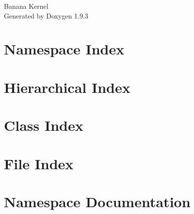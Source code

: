 \documentclass[twoside]{book}
\newcommand{\+}{\discretionary{\mbox{\scriptsize$\hookleftarrow$}}{}{}}
\newcommand{\clearemptydoublepage}{%
    \newpage{\pagestyle{empty}\cleardoublepage}%
  }
\begin{document}
  \raggedbottom
    \hypersetup{pageanchor=false,
                bookmarksnumbered=true,
                pdfencoding=unicode
               }
  \begin{titlepage}
  \vspace*{7cm}
  \begin{center}%
  {\Large Banana Kernel}\\
  \vspace*{1cm}
  {\large Generated by Doxygen 1.9.3}\\
  \end{center}
  \end{titlepage}
  \clearemptydoublepage
  \tableofcontents
  \clearemptydoublepage
  \hypersetup{pageanchor=true}
\chapter{Namespace Index}

\chapter{Hierarchical Index}

\chapter{Class Index}

\chapter{File Index}

\chapter{Namespace Documentation}







\end{document}
